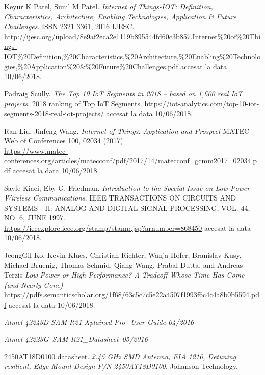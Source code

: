 \documentclass[12pt,a4paper]{report}
\begin{document}
\begin{thebibliography}{9}
Keyur K Patel, Sunil M Patel. 
\textit{Internet of Things-IOT: Definition, Characteristics, Architecture, Enabling Technologies, Application \& Future Challenges}.
ISSN 2321 3361, 2016 IJESC.
\url{http://ijesc.org/upload/8e9af2eca2e1119b895544fd60c3b857.Internet\%20of\%20Things-IOT\%20Definition,\%20Characteristics,\%20Architecture,\%20Enabling\%20Technologies,\%20Application\%20\&\%20Future\%20Challenges.pdf}  accesat la data 10/06/2018.

Padraig Scully.
\textit{The Top 10 IoT Segments in 2018 – based on 1,600 real IoT projects}. 
2018 ranking of Top IoT Segments.
\href{https://iot-analytics.com/top-10-iot-segments-2018-real-iot-projects/}{https://iot-analytics.com/top-10-iot-segments-2018-real-iot-projects/} accesat la data 10/06/2018.

Ran Liu, Jinfeng Wang.
\textit{Internet of Things: Application and Prospect }
MATEC Web of Conferences 100, 02034 (2017)\\
\url{https://www.matec-conferences.org/articles/matecconf/pdf/2017/14/matecconf\_gcmm2017\_02034.pdf} accesat la data 10/06/2018.


Sayfe Kiaei, Eby G. Friedman.
\textit{Introduction to the Special Issue on Low Power Wireless Communications}.
IEEE TRANSACTIONS ON CIRCUITS AND SYSTEMS—II: ANALOG AND DIGITAL SIGNAL PROCESSING, VOL. 44, NO. 6, JUNE 1997.\\
\url{https://ieeexplore.ieee.org/stamp/stamp.jsp?arnumber=868450} accesat la data 10/06/2018.

JeongGil Ko, Kevin Klues, Christian Richter, Wanja Hofer, Branislav Kusy, Michael Bruenig, Thomas Schmid, Qiang Wang, Prabal Dutta, and Andreas Terzis
\textit{Low Power or High Performance? A Tradeoff Whose Time Has Come (and Nearly Gone)}\\
\url{https://pdfs.semanticscholar.org/1f68/63c5c7c5e22a4507f1993f6c4c4a8b0b5594.pdf} accesat la data 10/06/2018.

\textit{Atmel-42243D-SAM-R21-Xplained-Pro\_User Guide-04/2016}

\textit{Atmel-42223G–SAM-R21\_Datasheet–05/2016}

2450AT18D0100 datasheet. 
\textit{2.45 GHz SMD Antenna, EIA 1210, Detuning resilient, Edge Mount Design P/N 2450AT18D0100}.
Johanson Technology.


\end{thebibliography}
\end{document}
